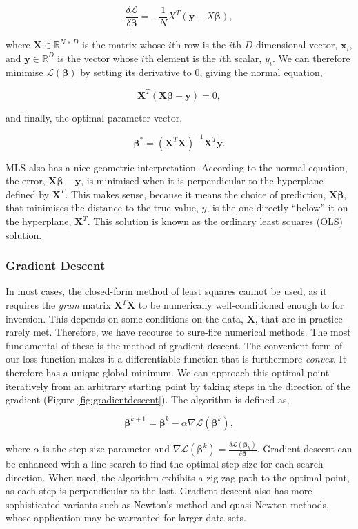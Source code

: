 \documentclass[11pt]{amsart}
\begin{document}
$$\frac{\delta\mathcal{L}}{\delta\boldsymbol\beta} = -\frac{1}{N}X^T(\mathbf{y} - X\boldsymbol\beta),$$

where $\mathbf{X} \in \mathbb{R}^{N\times D}$ is the matrix whose $i$th row is the $i$th $D$-dimensional vector, $\mathbf{x}_i$, and $\mathbf{y} \in \mathbb{R}^D$ is the vector whose $i$th element is the $i$th scalar, $y_i$. We can therefore minimise $\mathcal{L}(\boldsymbol\beta)$ by setting its derivative to 0, giving the normal equation,

$$\mathbf{X}^T(\mathbf{X}\boldsymbol\beta - \mathbf{y}) = 0,$$

and finally, the optimal parameter vector,

$$\boldsymbol\beta^* = (\mathbf{X}^T\mathbf{X})^{-1}\mathbf{X}^T\mathbf{y}.$$

MLS also has a nice geometric interpretation. According to the normal equation, the error, $\mathbf{X}\boldsymbol\beta - \mathbf{y}$, is minimised when it is perpendicular to the hyperplane defined by $\mathbf{X}^T$. This makes sense, because it means the choice of prediction, $\mathbf{X}\boldsymbol\beta$, that minimises the distance to the true value, $y$, is the one directly ``below'' it on the hyperplane, $\mathbf{X}^T$. This solution is known as the ordinary least squares (OLS) solution.

\subsubsection{Gradient Descent}

In most cases, the closed-form method of least squares cannot be used, as it requires the \emph{gram} matrix $\mathbf{X}^T\mathbf{X}$ to be numerically well-conditioned enough to for inversion. This depends on some conditions on the data, $\mathbf{X}$, that are in practice rarely met. Therefore, we have recourse to sure-fire numerical methods. The most fundamental of these is the method of gradient descent. The convenient form of our loss function makes it a differentiable function that is furthermore \emph{convex}. It therefore has a unique global minimum. We can approach this optimal point iteratively from an arbitrary starting point by taking steps in the direction of the gradient (Figure \ref{fig:gradientdescent}). The algorithm is defined as,

$$\boldsymbol\beta^{k+1} = \boldsymbol\beta^{k} - \alpha \nabla\mathcal{L}(\boldsymbol\beta^k),$$

where $\alpha$ is the step-size parameter and $\nabla\mathcal{L}(\boldsymbol\beta^k) = \frac{\delta\mathcal{L}(\boldsymbol\beta_k)}{\delta\boldsymbol\beta}$. Gradient descent can be enhanced with a line search to find the optimal step size for each search direction. When used, the algorithm exhibits a zig-zag path to the optimal point, as each step is perpendicular to the last. Gradient descent also has more sophisticated variants such as Newton's method and quasi-Newton methods, whose application may be warranted for larger data sets.
\end{document}
